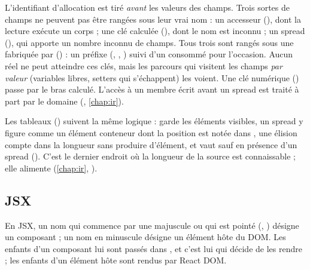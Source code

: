 
L'identifiant d'allocation est tiré \emph{avant} les valeurs des champs. Trois sortes de champs ne peuvent pas être rangées sous leur vrai nom : un accesseur (), dont la lecture exécute un corps ; une clé calculée (), dont le nom est inconnu ; un spread (), qui apporte un nombre inconnu de champs. Tous trois sont rangés sous une  fabriquée par  () : un préfixe (\code{[accessor]}, \code{[computed]}, ) suivi d'un  consommé pour l'occasion. Aucun  réel ne peut atteindre ces clés, mais les parcours qui visitent les champs \emph{par valeur} (variables libres, setters qui s'échappent) les voient. Une clé numérique () passe par le bras \og calculé\fg{}. L'accès à un membre écrit avant un spread est traité à part par le domaine (, \cref{chap:ir}).

Les tableaux () suivent la même logique :  garde les éléments visibles, un spread y figure comme un élément \og conteneur\fg{} dont la position est notée dans , une élision compte dans la longueur sans produire d'élément, et  vaut  sauf en présence d'un spread (). C'est le dernier endroit où la longueur de la source est connaissable ; elle alimente  (\cref{chap:ir}, ).

\subsection{JSX}


\begin{react}
En JSX, un nom qui commence par une majuscule ou qui est pointé (, ) désigne un composant ; un nom en minuscule désigne un élément hôte du DOM. Les enfants d'un composant lui sont passés dans , et c'est lui qui décide de les rendre ; les enfants d'un élément hôte sont rendus par React DOM.
\end{react}

